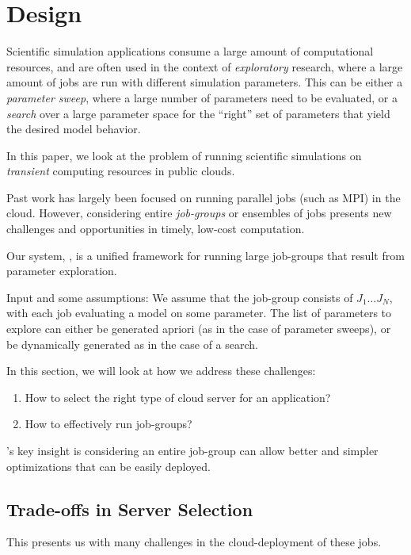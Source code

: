 \section{Design}

Scientific simulation applications consume a large amount of computational resources, and are often used in the context of \emph{exploratory} research, where a large amount of jobs are run with  different simulation parameters.
This can be either a \emph{parameter sweep}, where a large number of parameters need to be evaluated, or a \emph{search} over a large parameter space for the ``right'' set of parameters that yield the desired model behavior.

In this paper, we look at the problem of running scientific simulations on \emph{transient} computing resources in public clouds. 


Past work has largely been focused on running parallel jobs (such as MPI) in the cloud. 
However, considering entire \emph{job-groups} or ensembles of jobs presents new challenges and opportunities in timely, low-cost computation.

Our system, \sysname, is a unified framework for running large job-groups that result from parameter exploration. 

Input and some assumptions:
We assume that the job-group consists of $J_1\ldots J_N$, with each job evaluating a model on some parameter.
The list of parameters to explore can either be generated apriori (as in the case of parameter sweeps), or be dynamically generated as in the case of a search.

In this section, we will look at how we address these challenges:
\begin{enumerate}
\item How to select the right type of cloud server for an application?
\item How to effectively run job-groups?
\end{enumerate}

\sysname's key insight is considering an entire job-group can allow better and simpler optimizations that can be easily deployed. 



\subsection{Trade-offs in Server Selection}

This presents us with many challenges in the cloud-deployment of these jobs.


